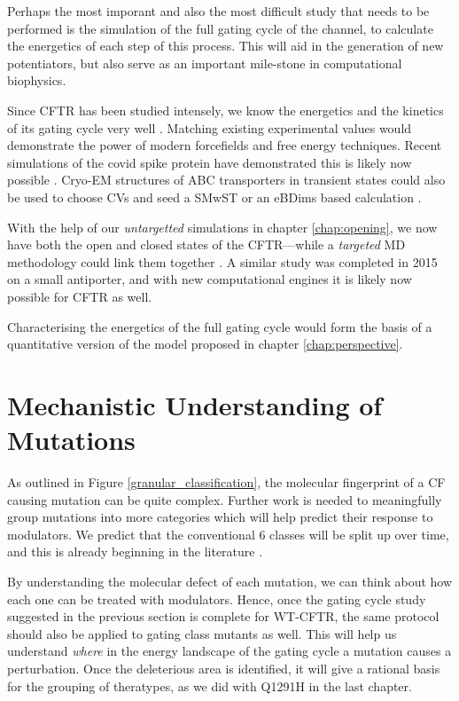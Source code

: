 Perhaps the most imporant and also the most difficult study that needs to be performed is the simulation of the full gating cycle of the channel, to calculate the energetics of each step of this process. This will aid in the generation of new potentiators, but also serve as an important mile-stone in computational biophysics.

Since CFTR has been studied intensely, we know the energetics and the kinetics of its gating cycle very well \cite{csanady2017}. Matching existing experimental values would demonstrate the power of modern forcefields and free energy techniques. Recent simulations of the covid spike protein have demonstrated this is likely now possible \cite{casalino2021}. Cryo-EM structures of ABC transporters in transient states could also be used to choose CVs and seed a SMwST or an eBDims based calculation \cite{hofmann2019, orellana2016, roux2021, pan2008}. 

With the help of our \textit{untargetted} simulations in chapter \ref{chap:opening}, we now have both the open and closed states of the CFTR---while a \textit{targeted} MD methodology could link them together \cite{zhang2018, liu2017}. A similar study was completed in 2015 on a small antiporter, and with new computational engines it is likely now possible for CFTR as well\cite{moradi2015}.

Characterising the energetics of the full gating cycle would form the basis of a quantitative version of the model proposed in chapter \ref{chap:perspective}.

\section{Mechanistic Understanding of Mutations}
As outlined in Figure \ref{granular_classification}, the molecular fingerprint of a CF causing mutation can be quite complex. Further work is needed to meaningfully group mutations into more categories which will help predict their response to modulators. We predict that the conventional 6 classes will be split up over time, and this is already beginning in the literature \cite{veit2016}. 

By understanding the molecular defect of each mutation, we can think about how each one can be treated with modulators. Hence, once the gating cycle study suggested in the previous section is complete for WT-CFTR, the same protocol should also be applied to gating class mutants as well. This will help us understand \textit{where} in the energy landscape of the gating cycle a mutation causes a perturbation. Once the deleterious area is identified, it will give a rational basis for the grouping of theratypes, as we did with Q1291H in the last chapter.

